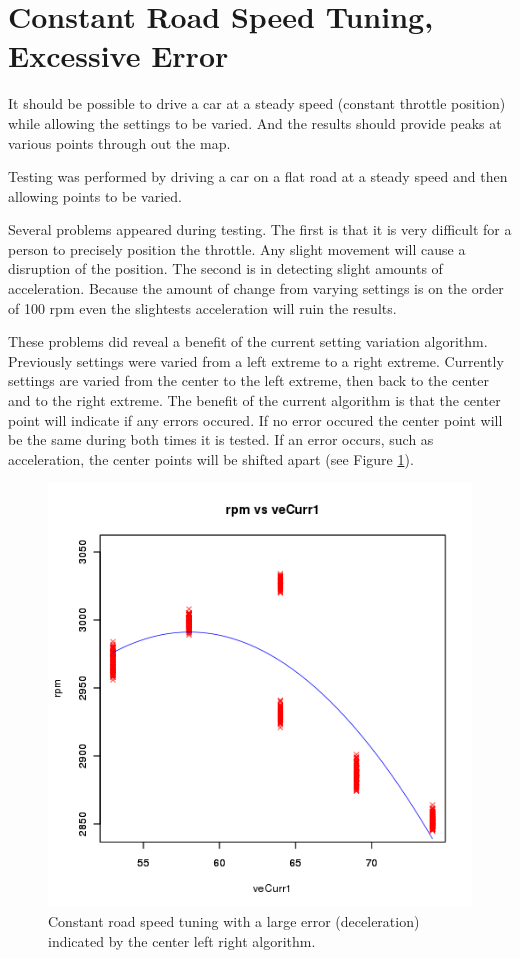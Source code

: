 \documentclass{article}
\begin{document}
\section{Constant Road Speed Tuning, Excessive Error}
\label{roaderr}

It should be possible to drive a car at a steady speed (constant throttle
position) while allowing the settings to be varied.
And the results should provide peaks at various points through out the map.

Testing was performed by driving a car on a flat road at a steady speed
and then allowing points to be varied.

Several problems appeared during testing.
The first is that it is very difficult for a person to precisely
position the throttle.
Any slight movement will cause a disruption of the position.
The second is in detecting slight amounts of acceleration.
Because the amount of change from varying settings is on the order 
of 100 rpm even the slightests acceleration will ruin the results.

These problems did reveal a benefit of the current setting variation
algorithm.
Previously settings were varied from a left extreme to a right extreme.
Currently settings are varied from the center to the left extreme,
then back to the center and to the right extreme.
The benefit of the current algorithm is that the center point will
indicate if any errors occured.
If no error occured the center point will be the same during both times
it is tested.
If an error occurs, such as acceleration, the center points will be
shifted apart (see Figure \ref{fig:ssrerr}).

\begin{figure}[!htb]
\center
\includegraphics[scale=0.5]{plotdata-veTable1-20110613-15:17:10.png}
\caption{Constant road speed tuning with a large error (deceleration)
indicated by the center left right algorithm.}
\label{fig:ssrerr}
\end{figure}
\end{document}
